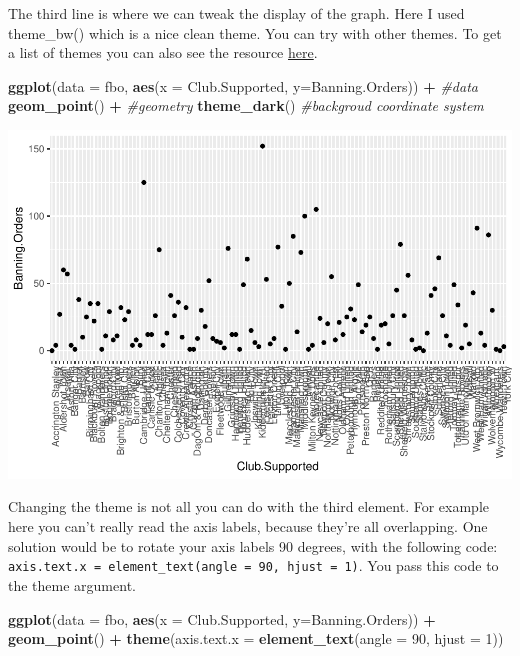 \documentclass[]{book}
\newenvironment{Shaded}{\begin{snugshade}}{\end{snugshade}}
\newcommand{\CommentTok}[1]{\textcolor[rgb]{0.56,0.35,0.01}{\textit{#1}}}
\newcommand{\DataTypeTok}[1]{\textcolor[rgb]{0.13,0.29,0.53}{#1}}
\newcommand{\DecValTok}[1]{\textcolor[rgb]{0.00,0.00,0.81}{#1}}
\newcommand{\KeywordTok}[1]{\textcolor[rgb]{0.13,0.29,0.53}{\textbf{#1}}}
\newcommand{\NormalTok}[1]{#1}
\newcommand{\OperatorTok}[1]{\textcolor[rgb]{0.81,0.36,0.00}{\textbf{#1}}}
\newcommand{\StringTok}[1]{\textcolor[rgb]{0.31,0.60,0.02}{#1}}
\theoremstyle{definition}
\theoremstyle{definition}
\theoremstyle{definition}
\theoremstyle{remark}
\begin{document}
The third line is where we can tweak the display of the graph. Here I
used theme\_bw() which is a nice clean theme. You can try with other
themes. To get a list of themes you can also see the resource
\href{http://docs.ggplot2.org/current/}{here}.

\begin{Shaded}
\begin{Highlighting}[]
\KeywordTok{ggplot}\NormalTok{(}\DataTypeTok{data =}\NormalTok{ fbo, }\KeywordTok{aes}\NormalTok{(}\DataTypeTok{x =}\NormalTok{ Club.Supported, }\DataTypeTok{y=}\NormalTok{Banning.Orders)) }\OperatorTok{+}\StringTok{     }\CommentTok{#data}
\StringTok{   }\KeywordTok{geom_point}\NormalTok{() }\OperatorTok{+}\StringTok{                                                   }\CommentTok{#geometry}
\StringTok{  }\KeywordTok{theme_dark}\NormalTok{()                                                      }\CommentTok{#backgroud coordinate system}
\end{Highlighting}
\end{Shaded}

\includegraphics{03-visualisation_files/figure-latex/unnamed-chunk-5-1.pdf}

Changing the theme is not all you can do with the third element. For
example here you can't really read the axis labels, because they're all
overlapping. One solution would be to rotate your axis labels 90
degrees, with the following code:
\texttt{axis.text.x\ =\ element\_text(angle\ =\ 90,\ hjust\ =\ 1)}. You
pass this code to the theme argument.

\begin{Shaded}
\begin{Highlighting}[]
\KeywordTok{ggplot}\NormalTok{(}\DataTypeTok{data =}\NormalTok{ fbo, }\KeywordTok{aes}\NormalTok{(}\DataTypeTok{x =}\NormalTok{ Club.Supported, }\DataTypeTok{y=}\NormalTok{Banning.Orders)) }\OperatorTok{+}\StringTok{     }
\StringTok{   }\KeywordTok{geom_point}\NormalTok{() }\OperatorTok{+}\StringTok{                                                   }
\StringTok{  }\KeywordTok{theme}\NormalTok{(}\DataTypeTok{axis.text.x =} \KeywordTok{element_text}\NormalTok{(}\DataTypeTok{angle =} \DecValTok{90}\NormalTok{, }\DataTypeTok{hjust =} \DecValTok{1}\NormalTok{))                                   }
\end{Highlighting}
\end{Shaded}
\end{document}

